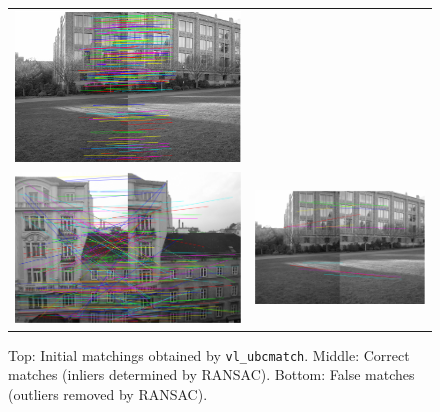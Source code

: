 \begin{figure}[h]
\begin{tabular}{cc}
	\includegraphics[width=\mywidth]{figures/ransac2.png} \\
	\includegraphics[width=\mywidth]{figures/ransac_removes1.png} &
	\includegraphics[width=\mywidth]{figures/ransac_removes2.png} \\

	\end{tabular}
	\caption{Top: Initial matchings obtained by \texttt{vl\_ubcmatch}. Middle: Correct matches (inliers determined by RANSAC). Bottom: False matches (outliers removed by RANSAC).}
	\label{fig:a4:matching}
\end{figure}

